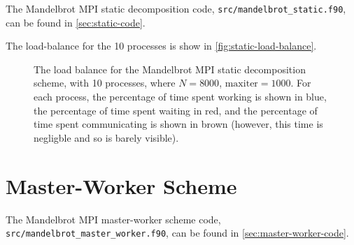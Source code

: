 \documentclass{article}
\begin{document}
The Mandelbrot MPI static decomposition code,
\lstinline[style=ff]{src/mandelbrot_static.f90}, can be found in
\autoref{sec:static-code}.



The load-balance for the 10 processes is show in
\autoref{fig:static-load-balance}.
\begin{figure}[h]
  \centering
  \caption{The load balance for the Mandelbrot MPI static decomposition scheme,
    with 10 processes, where $N = 8000$, $\mathrm{maxiter} = 1000$. For each
    process, the percentage of time spent working is shown in blue, the
    percentage of time spent waiting in red, and the percentage of time spent
    communicating is shown in brown (however, this time is negligble and so is
    barely visible).}
  \label{fig:static-load-balance}
\end{figure}

\newpage
\section{Master-Worker Scheme}
\label{sec:master-worker}

The Mandelbrot MPI master-worker scheme code,
\lstinline[style=ff]{src/mandelbrot_master_worker.f90}, can be
found in \autoref{sec:master-worker-code}.

\end{document}
